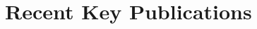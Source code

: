 \documentclass[10pt, letterpaper]{article}
\newenvironment{onecolentry}{
    \begin{adjustwidth}{
        0 cm + 0.00001 cm
    }{
        0 cm + 0.00001 cm
    }
}{
    \end{adjustwidth}
} %
\begin{document}
            

                

\section{Recent Key Publications}
\end{document}

